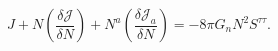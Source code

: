 \begin{equation}
J + N\left(\frac{\delta \mathcal{J}}{\delta N}\right)
  + N^a \left(\frac{\delta \mathcal{J}_a}{\delta N}\right)
  = -8\pi G_nN^2S^{\tau\tau}.
\end{equation}

